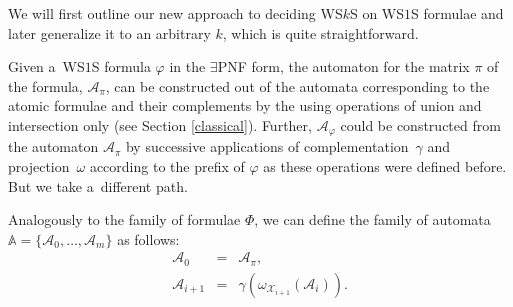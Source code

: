 We will first outline our new approach to deciding WS$k$S on WS$1$S formulae and
later generalize it to an arbitrary $k$, which is quite straightforward.

Given a~WS$1$S formula $\varphi$ in the $\exists$PNF form, the automaton for
the matrix $\pi$ of the formula, $\mathcal{A}_\pi$, can be constructed out of
the automata corresponding to the atomic formulae and their complements by the
using operations of union and intersection only (see Section \ref{classical}).
Further, $\mathcal{A}_\varphi$ could be constructed from the automaton $\mathcal{A}_\pi$ by successive
applications of complementation~$\gamma$ and projection~$\omega$ according to
the prefix of $\varphi$ as these operations were defined before. But we take a~different path.

% 


Analogously to the family of formulae $\Phi$, we can define
the family of automata $\mathbb{A} = \{\mathcal{A}_0,\ldots,\mathcal{A}_m\}$ as follows:
 \begin{eqnarray}
  \mathcal{A}_0 & = & \mathcal{A}_\pi,\\
  \mathcal{A}_{i+1} & = & \gamma(\omega_{\mathcal{X}_{i+1}}(\mathcal{A}_i)).
 \end{eqnarray}
 
